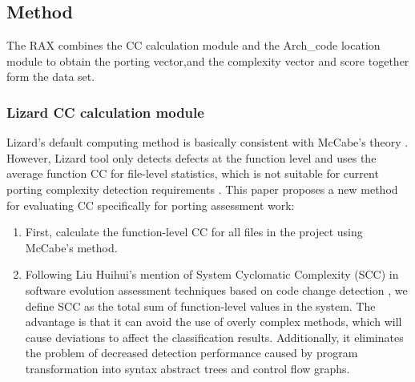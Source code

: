 \documentclass[sigconf,screen,review,anonymous]{acmart}
\begin{document}
\subsection{Method}
\label{sec:method}
The RAX combines the CC calculation module and the Arch\_code location module to obtain the porting vector,and the complexity vector and score together form the data set.

\subsubsection{Lizard CC calculation module}
Lizard's default computing method is basically consistent with McCabe's theory \cite{1702388}.
However, Lizard tool only detects defects at the function level and uses the average function CC for file-level statistics, which is not suitable for current porting complexity detection requirements \cite{9402593}.
This paper proposes a new method for evaluating CC specifically for porting assessment work:
\begin{enumerate}
  \item First, calculate the function-level CC for all files in the project using McCabe's method.
  \item Following Liu Huihui's mention of System Cyclomatic Complexity (SCC) in software evolution assessment techniques based on code change detection \cite{liuhuihui00}, we define SCC as the total sum of function-level values in the system.
  The advantage is that it can avoid the use of overly complex methods, which will cause deviations to affect the classification results.
  Additionally, it eliminates the problem of decreased detection performance caused by program transformation into syntax abstract trees and control flow graphs.
\end{enumerate}
\end{document}
